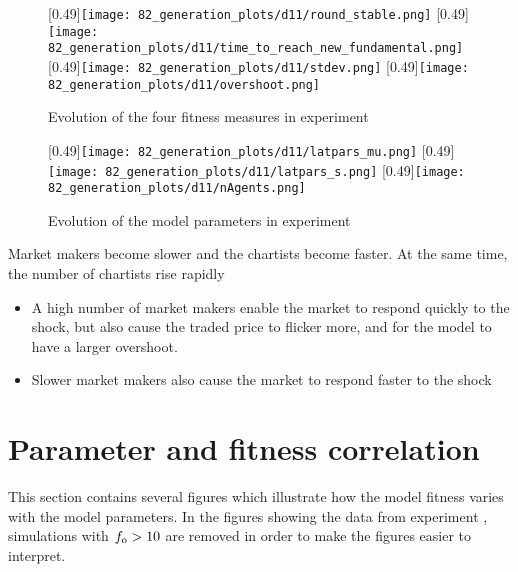 \begin{figure}
	\centering
	[0.49\linewidth]{\texttt{[image: 82\_generation\_plots/d11/round\_stable.png]}}
	[0.49\linewidth]{\texttt{[image: 82\_generation\_plots/d11/time\_to\_reach\_new\_fundamental.png]}}
	[0.49\linewidth]{\texttt{[image: 82\_generation\_plots/d11/stdev.png]}}
	[0.49\linewidth]{\texttt{[image: 82\_generation\_plots/d11/overshoot.png]}}
	\caption{Evolution of the four fitness measures in experiment \deleven}
	\label{fig:d11_evolution_fitness}
\end{figure}


\begin{figure}
	\centering
	[0.49\linewidth]{\texttt{[image: 82\_generation\_plots/d11/latpars\_mu.png]}}
	[0.49\linewidth]{\texttt{[image: 82\_generation\_plots/d11/latpars\_s.png]}}
	[0.49\linewidth]{\texttt{[image: 82\_generation\_plots/d11/nAgents.png]}}
	\caption{Evolution of the model parameters in experiment \deleven}
	\label{fig:d11_evolution_parameters}
\end{figure}

Market makers become slower and the chartists become faster. At the same time, the number of chartists rise rapidly



\begin{itemize}
\item A high number of market makers enable the market to respond quickly to the shock, but also cause the traded price to flicker more, and for the model to have a larger overshoot.
\item Slower market makers also cause the market to respond faster to the shock
\end{itemize}


\section{Parameter and fitness correlation}
This section contains several figures which illustrate how the model fitness varies with the model parameters. In the figures showing the data from experiment \deleven, simulations with $f_\text{o}>10$ are removed in order to make the figures easier to interpret.

